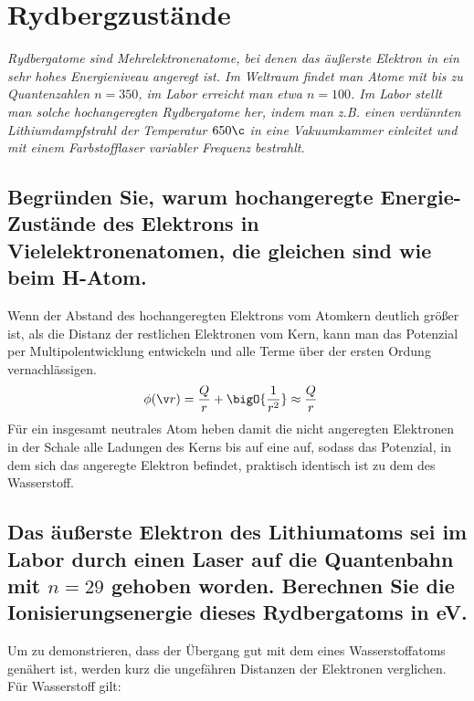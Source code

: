 \documentclass[ex,minted]{exercise_4.1}
\begin{document}
\section{Rydbergzustände}
{\it 
Rydbergatome sind Mehrelektronenatome, bei denen das äußerste Elektron in ein sehr hohes Energieniveau angeregt ist. Im Weltraum findet man Atome mit bis zu Quantenzahlen $n = 350$, im Labor erreicht man etwa $n = 100$. Im Labor stellt man solche hochangeregten Rydbergatome her, indem man z.B. einen verdünnten Lithiumdampfstrahl der Temperatur $650 \c$ in eine Vakuumkammer einleitet und mit einem Farbstofflaser variabler Frequenz bestrahlt.
}
\subsection{Begründen Sie, warum hochangeregte Energie-Zustände des Elektrons in Vielelektronenatomen, die gleichen sind wie beim H-Atom.}

\dottedlinett 

Wenn der Abstand des hochangeregten Elektrons vom Atomkern deutlich größer ist, als die Distanz der restlichen Elektronen vom Kern, kann man das Potenzial per Multipolentwicklung entwickeln und alle Terme über der ersten Ordung vernachlässigen.  
\begin{align*}
    \phi(\v r) &= \frac{Q}{r} + \bigO{\frac{1}{r^2}} \approx \frac Q r
\end{align*}
Für ein insgesamt neutrales Atom heben damit die nicht angeregten Elektronen in der Schale alle Ladungen des Kerns bis auf eine auf, sodass das Potenzial, in dem sich das angeregte Elektron befindet, praktisch identisch ist zu dem des Wasserstoff.  

\subsection{Das äußerste Elektron des Lithiumatoms sei im Labor durch einen Laser auf die Quantenbahn mit $n = 29$ gehoben worden. Berechnen Sie die Ionisierungsenergie dieses Rydbergatoms in eV.}

\dottedlinett

Um zu demonstrieren, dass der Übergang gut mit dem eines Wasserstoffatoms genähert ist, werden kurz die ungefähren Distanzen der Elektronen verglichen. Für Wasserstoff gilt:
\end{document}

